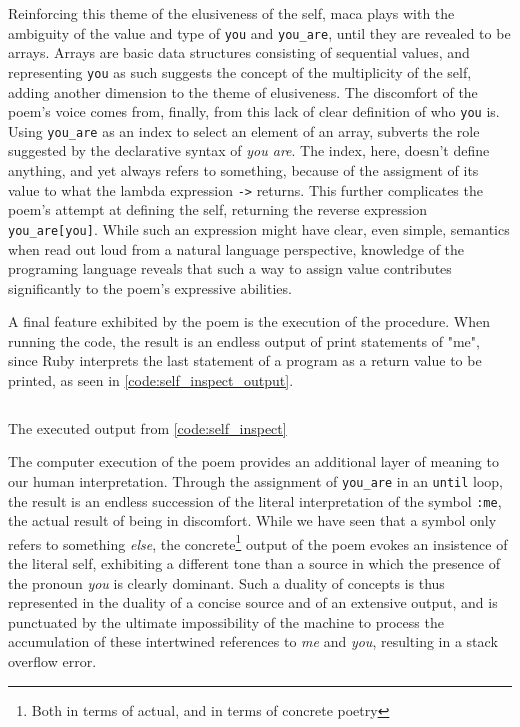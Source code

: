 Reinforcing this theme of the elusiveness of the self, maca plays with the ambiguity of the value and type of \lstinline{you} and \lstinline{you_are}, until they are revealed to be arrays. Arrays are basic data structures consisting of sequential values, and representing \lstinline{you} as such suggests the concept of the multiplicity of the self, adding another dimension to the theme of elusiveness. The discomfort of the poem's voice comes from, finally, from this lack of clear definition of who \lstinline{you} is. Using \lstinline{you_are} as an index to select an element of an array, subverts the role suggested by the declarative syntax of \emph{you are}. The index, here, doesn't define anything, and yet always refers to something, because of the assigment of its value to what the lambda expression \lstinline{->} returns. This further complicates the poem's attempt at defining the self, returning the reverse expression \lstinline{you_are[you]}. While such an expression might have clear, even simple, semantics when read out loud from a natural language perspective, knowledge of the programing language reveals that such a way to assign value contributes significantly to the poem's expressive abilities.

A final feature exhibited by the poem is the execution of the procedure. When running the code, the result is an endless output of print statements of "me", since Ruby interprets the last statement of a program as a return value to be printed, as seen in \ref{code:self_inspect_output}.

\begin{listing}
  \inputminted{text}{./corpus/self_inspect.txt}
  \caption{The executed output from \ref{code:self_inspect}}
  \label{code:self_inspect_output}
\end{listing}


The computer execution of the poem provides an additional layer of meaning to our human interpretation. Through the assignment of \lstinline{you_are} in an \lstinline{until} loop, the result is an endless succession of the literal interpretation of the symbol \lstinline{:me}, the actual result of being in discomfort. While we have seen that a symbol only refers to something \emph{else}, the concrete\footnote{Both in terms of actual, and in terms of concrete poetry} output of the poem evokes an insistence of the literal self, exhibiting a different tone than a source in which the presence of the pronoun \emph{you} is clearly dominant. Such a duality of concepts is thus represented in the duality of a concise source and of an extensive output, and is punctuated by the ultimate impossibility of the machine to process the accumulation of these intertwined references to \emph{me} and \emph{you}, resulting in a stack overflow error.


